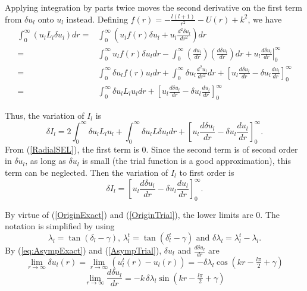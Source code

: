 \documentclass[Dissertation.tex]{subfiles}
\begin{document}
\noindent Applying integration by parts twice moves the second derivative on the first term from $\delta u_l$ onto $u_l$ instead.  Defining $f(r) = -\frac{l(l+1)}{r^2} - U(r) + k^2$, we have
\begin{align}
\nonumber \int_0^\infty (u_l L_l\delta u_l)dr =& \int_0^\infty \left(u_l f(r) \delta u_l + u_l \frac{d^2\delta u_l}{dr^2}\right)dr \\
\nonumber =& \int_0^\infty u_l f(r) \delta u_l dr - \int_0^\infty (\frac{du_l}{dr})(\frac{d\delta u_l}{dr}) dr + u_l \left. \frac{d\delta u_l}{dr} \right|_0^\infty \\
\nonumber =& \int_0^\infty \delta u_l f(r) u_l dr + \int_0^\infty \delta u_l \frac{d^2u_l}{dr^2} dr + \left[u_l \frac{d\delta u_l}{dr} - \delta u_l \frac{du_l}{dr} \right]_0^\infty \\
=& \int_0^\infty \delta u_l L_l u_l dr + \left[u_l \frac{d\delta u_l}{dr} - \delta u_l \frac{du_l}{dr} \right]_0^\infty
\end{align}

\noindent Thus, the variation of $I_l$ is
\begin{equation}
\delta I_l = 2 \int_0^\infty \delta u_l L_l u_l + \int_0^\infty \delta u_l L \delta u_l dr + \left[u_l \frac{d\delta u_l}{dr} - \delta u_l \frac{du_l}{dr} \right]_0^\infty.
\label{DeltaIl}
\end{equation}
From (\ref{RadialSEL}), the first term is 0.  Since the second term is of second order in $\delta u_l$, as long as $\delta u_l$ is small (the trial function is a good approximation), this term can be neglected.  Then the variation of $I_l$ to first order is
\begin{equation}
\delta I_l = \left[u_l \frac{d\delta u_l}{dr} - \delta u_l \frac{du_l}{dr} \right]_0^\infty.
\label{Parts1}
\end{equation}

\noindent By virtue of (\ref{OriginExact}) and (\ref{OriginTrial}), the lower limits are 0.  The notation is simplified by using
\begin{equation}
\lambda_l = \tan(\delta_l - \gamma),\, \lambda_l^t = \tan(\delta_l^t - \gamma) \text{ and } \delta\lambda_l = \lambda_l^t - \lambda_l.
\end{equation}
By (\ref{eq:AsympExact}) and (\ref{AsympTrial}), $\delta u_l$ and $\frac{d\delta u_l}{dr}$ are
\begin{equation}
\lim_{r \to \infty} \delta u_l(r) = \lim_{r \to \infty} (u_l^t(r) - u_l(r)) = -\delta\lambda_l \cos(k r - \tfrac{l \pi}{2} + \gamma)
\end{equation}
\begin{equation}
\lim_{r \to \infty} \frac{d\delta u_l}{dr} = -k \,\delta\!\lambda_l \sin(k r - \tfrac{l \pi}{2} + \gamma)
\end{equation}
\end{document}
